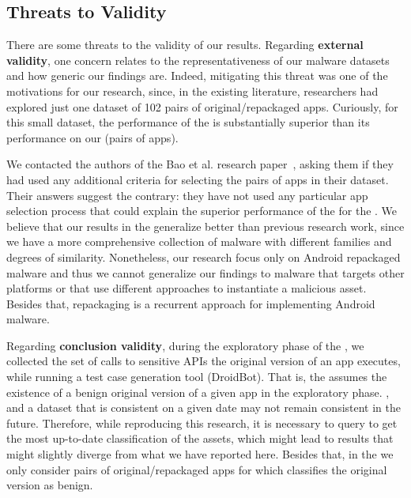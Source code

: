 \subsection{Threats to Validity}\label{sec:threats}


There are some threats to the validity of our results.
Regarding {\bf external validity}, one concern relates to the 
representativeness of our malware datasets and how generic our findings are.
Indeed, mitigating this threat was one of the motivations for our research,
since, in the existing literature, researchers had explored just
one dataset of 102 pairs of original/repackaged apps. Curiously,
for this small dataset, the performance of the
\mas is substantially superior
than its performance on our \cds (\apps pairs of
apps).

We contacted the authors of the Bao et al. research paper~\cite{DBLP:conf/wcre/BaoLL18}, asking them
if they had used any additional criteria for selecting the pairs of apps in their
dataset. Their answers suggest the contrary: they have not used
any particular app selection process that
could explain the superior performance of the \mas for the \sds. We believe that
our results in the \cds generalize better than previous research work,
since we have a more comprehensive collection of malware with different
families and degrees of similarity. Nonetheless, our
research focus only on Android repackaged malware and thus we cannot generalize
our findings to malware that targets other platforms or that use different approaches
to instantiate a malicious asset. Besides that, repackaging is a recurrent approach
for implementing Android malware.

Regarding {\bf conclusion validity}, during the exploratory phase of the \mas, we collected the set of calls to sensitive APIs the original version of
an app executes, while running a test case generation tool (DroidBot).
That is, the \mas assumes the existence of a benign original
version of a given app in the exploratory phase. , and a dataset that is consistent on a given date may not remain consistent in the future. Therefore, while reproducing this research, it is necessary to query \vt to get the most up-to-date classification of the assets, which might lead to results that might slightly
diverge from what we have reported here. Besides that, in the \cds we only consider
pairs of original/repackaged apps for which \vt classifies the original version as benign. 

